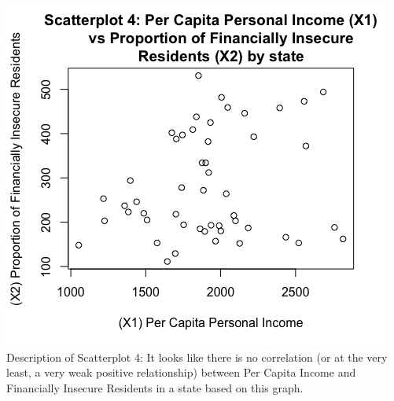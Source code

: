 \documentclass[12pt,letterpaper]{article}
\begin{document}
\begin{itemize}
		\newpage	
		 
		
		\begin{center}
		\includegraphics[scale=.80]{Scatterplot4.png}
		Description of Scatterplot 4: It looks like there is no correlation (or at the very least, a very weak positive relationship) between Per Capita Income and Financially Insecure Residents in a state based on this graph.
		\end{center}
	
		\newpage	
		 
		

\end{itemize}
\end{document}
